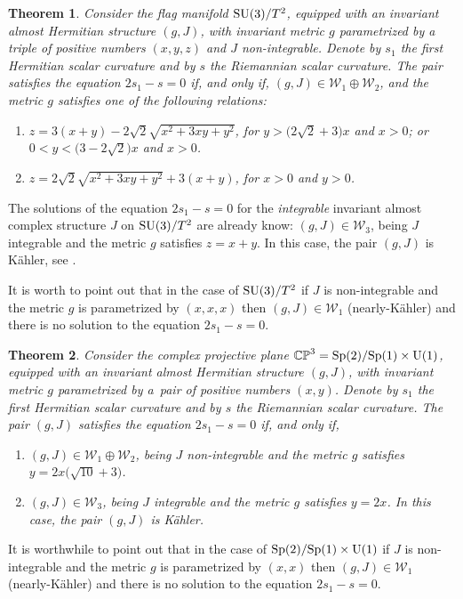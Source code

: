 \documentclass[pdftex]{sigma}%
\numberwithin{equation}{section}
\newtheorem{Theorem}{Theorem}[section]
\begin{document}
\begin{Theorem}
Consider the flag manifold ${\rm SU}(3)/T^2$, equipped with an invariant almost Hermitian structure $(g,J)$, with invariant metric $g$ parametrized by a triple of positive numbers $(x,y,z)$ and $J$ non-integrable. Denote by $s_1$ the first Hermitian scalar curvature and by $s$ the Riemannian scalar curvature. The pair satisfies the equation $2s_1-s=0$ if, and only if,
$(g,J) \in\mathcal{W}_{1}\oplus \mathcal{W}_{2}$, and the metric $g$ satisfies one of the following relations:
	\begin{enumerate}\itemsep=0pt
	\item[$1.$] $z=3 (x+y)-2 \sqrt{2} \sqrt{x^2+3 x y+y^2}$, for $y> \big(2\sqrt{2}+3\big)x $ and $x>0$; or
$0<y< \big(3 -2 \sqrt{2}\big)x$ and $x>0$.

	\item[$2.$] $z=2 \sqrt{2} \sqrt{x^2+3 x y+y^2}+3 (x+y)$, for $x>0$ and $y>0$.
	\end{enumerate}
\end{Theorem}

\begin{Remark}
The solutions of the equation $2s_1-s=0$ for the {\em integrable} invariant almost complex structure $J$ on ${\rm SU}(3)/T^2$ are already know: $(g,J)\in\mathcal{W}_{3}$, being $J$ integrable and the metric $g$ satisfies $z=x+y$. In this case, the pair $(g,J)$ is K\"ahler, see \cite{fu2018twistor}.
\end{Remark}
\begin{Remark}
It is worth to point out that in the case of ${\rm SU}(3)/T^2$ if $J$ is non-integrable and the metric $g$ is parametrized by $(x,x,x)$ then $(g,J)\in \mathcal{W}_1$ (nearly-K\"ahler) and there is no solution to the equation $2s_1-s=0$.
\end{Remark}

\begin{Theorem}
Consider the complex projective plane $\mathbb{CP}^{3}={\rm Sp}(2)/{\rm Sp}(1)\times {\rm U}(1)$, equipped with an invariant almost Hermitian structure $(g,J)$, with invariant metric $g$ parametrized by a~pair of positive numbers $(x,y)$. Denote by $s_1$ the first Hermitian scalar curvature and by $s$ the Riemannian scalar curvature. The pair $(g,J)$ satisfies the equation $2s_1-s=0$ if, and only if,
\begin{enumerate}\itemsep=0pt
\item[$1.$] $(g,J) \in\mathcal{W}_{1}\oplus \mathcal{W}_{2}$, being $J$ non-integrable and the metric $g$ satisfies $y=2x\big(\sqrt{10} +3\big)$.
\item[$2.$] $(g,J)\in\mathcal{W}_{3}$, being $J$ integrable and the metric $g$ satisfies $y=2x$. In this case, the pair $(g,J)$ is K\"ahler.
\end{enumerate}
\end{Theorem}
\begin{Remark}
It is worthwhile to point out that in the case of ${\rm Sp}(2)/{\rm Sp}(1)\times {\rm U}(1)$ if $J$ is non-integrable and the metric $g$ is parametrized by $(x,x)$ then $(g,J)\in \mathcal{W}_1$ (nearly-K\"ahler) and there is no solution to the equation $2s_1-s=0$.
\end{Remark}
\end{document}
